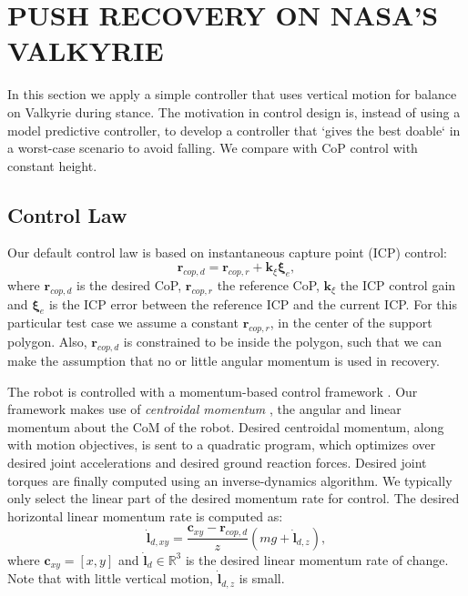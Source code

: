 \documentclass[letterpaper, 10 pt, conference]{ieeeconf}  %
\newcommand{\rcmpd}{\mathbf{r}_{cop,d}}
\newcommand{\rcmpr}{\mathbf{r}_{cop,r}}
\newcommand{\icpe}{\boldsymbol{\xi}_e}
\begin{document}
\section{PUSH RECOVERY ON NASA'S VALKYRIE}\label{sec:valkyrie}
In this section we apply a simple controller that uses vertical motion for balance on Valkyrie during stance. The motivation in control design is, instead of using a model predictive controller, to develop a controller that `gives the best doable` in a worst-case scenario to avoid falling. We compare with CoP control with constant height.
\subsection{Control Law}
Our default control law is based on instantaneous capture point (ICP) \cite{koolen2012capturability} control:
\begin{equation}
	\rcmpd = \rcmpr + \mathbf{k}_{\xi}\icpe,
\end{equation}
where $\rcmpd$ is the desired CoP, $\rcmpr$ the reference CoP, $\mathbf{k}_{\xi}$ the ICP control gain and $\icpe$ is the ICP error between the reference ICP and the current ICP. For this particular test case we assume a constant $\rcmpr$, in the center of the support polygon. Also, $\rcmpd$ is constrained to be inside the polygon, such that we can make the assumption that no or little angular momentum is used in recovery.

The robot is controlled with a momentum-based control framework \cite{koolen2016design}. Our framework makes use of \textit{centroidal momentum} \cite{orin2013centroidal}, the angular and linear momentum about the CoM of the robot. Desired centroidal momentum, along with motion objectives, is sent to a quadratic program, which optimizes over desired joint accelerations and desired ground reaction forces. Desired joint torques are finally computed using an inverse-dynamics algorithm. We typically only select the linear part of the desired momentum rate for control. The desired horizontal linear momentum rate is computed as:
\begin{equation}
	\dot{\mathbf{l}}_{d,xy} = \frac{\mathbf{c}_{xy}-\rcmpd}{z}(mg + \dot{\mathbf{l}}_{d,z}),
\end{equation}
where $\mathbf{c}_{xy}=[x,y]$ and $\dot{\mathbf{l}}_{d} \in \mathbb{R}^3$ is the desired linear momentum rate of change. Note that with little vertical motion, $ \dot{\mathbf{l}}_{d,z}$ is small.
\end{document}
